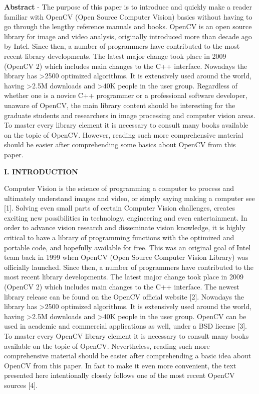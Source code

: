 \documentclass{bjtu-bachelor-thesis}
\begin{document}
\textbf{Abstract} - The purpose of this paper is to introduce and quickly make a reader familiar with OpenCV (Open Source Computer Vision) basics without having to go through the lengthy reference manuals and books. OpenCV is an open source library for image and video analysis, originally introduced more than decade ago by Intel. Since then, a number of programmers have contributed to the most recent library developments. The latest major change took place in 2009 (OpenCV 2) which includes main changes to the C++ interface. Nowadays the library has >2500 optimized algorithms. It is extensively used around the world, having >2.5M downloads and >40K people in the user group. Regardless of whether one is a novice C++ programmer or a professional software developer, unaware of OpenCV, the main library content should be interesting for the graduate students and researchers in image processing and computer vision areas. To master every library element it is necessary to consult many books available on the topic of OpenCV. However, reading such more comprehensive material should be easier after comprehending some basics about OpenCV from this paper. \par
\textbf{I. INTRODUCTION} \par
Computer Vision is the science of programming a computer to process and ultimately understand images and video, or simply saying making a computer see {[}1{]}. Solving even small parts of certain Computer Vision challenges, creates exciting new possibilities in technology, engineering and even entertainment. In order to advance vision research and disseminate vision knowledge, it is highly critical to have a library of programming functions with the optimized and portable code, and hopefully available for free. This was an original goal of Intel team back in 1999 when OpenCV (Open Source Computer Vision Library) was officially launched. Since then, a number of programmers have contributed to the most recent library developments. The latest major change took place in 2009 (OpenCV 2) which includes main changes to the C++ interface. The newest library release can be found on the OpenCV official website {[}2{]}. Nowadays the library has >2500 optimized algorithms. It is extensively used around the world, having >2.5M downloads and >40K people in the user group. OpenCV can be used in academic and commercial applications as well, under a BSD license {[}3{]}. To master every OpenCV library element it is necessary to consult many books available on the topic of OpenCV. Nevertheless, reading such more comprehensive material should be easier after comprehending a basic idea about OpenCV from this paper. In fact to make it even more convenient, the text presented here intentionally closely follows one of the most recent OpenCV sources {[}4{]}. \par
\end{document}
